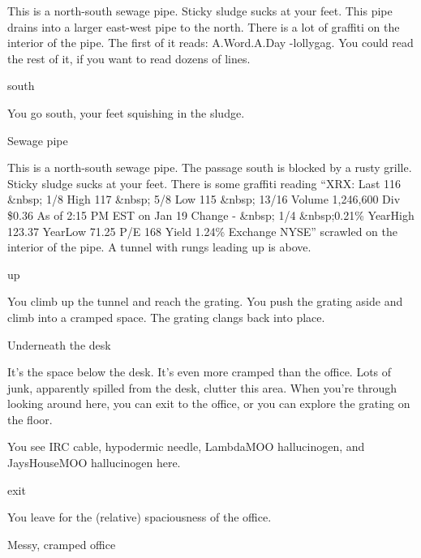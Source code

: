 \documentclass[10pt,twoside,openany]{memoir}
\begin{document}
{This is a north-south sewage pipe.  Sticky sludge sucks at your feet.  This
 pipe drains into a larger east-west pipe to the north.  There is a lot of
 graffiti on the interior of the pipe.  The first of it reads: A.Word.A.Day
 -lollygag.  You could read the rest of it, if you want to read dozens of
 lines.

south

You go south, your feet squishing in the sludge.

Sewage pipe

This is a north-south sewage pipe.  The passage south is blocked by a rusty
 grille.  Sticky sludge sucks at your feet.  There is some graffiti reading
 ``XRX: Last 116 \&nbsp; 1/8 High 117 \&nbsp; 5/8 Low 115 \&nbsp; 13/16 Volume
 1,246,600 Div \$0.36 As of  2:15 PM EST on Jan 19 Change - \&nbsp; 1/4
 \&nbsp;0.21\% YearHigh 123.37 YearLow 71.25 P/E 168 Yield 1.24\% Exchange NYSE''
 scrawled on the interior of the pipe.  A tunnel with rungs leading up is
 above.
 
up

You climb up the tunnel and reach the grating.  You push the grating aside and
 climb into a cramped space.  The grating clangs back into place.

Underneath the desk

It's the space below the desk.  It's even more cramped than the office.  Lots
 of junk, apparently spilled from the desk, clutter this area.  When you're
 through looking around here, you can exit to the office, or you can explore
 the grating on the floor.

You see IRC cable, hypodermic needle, LambdaMOO hallucinogen, and JaysHouseMOO hallucinogen here.

exit

You leave for the (relative) spaciousness of the office.

Messy, cramped office

}
\end{document}

